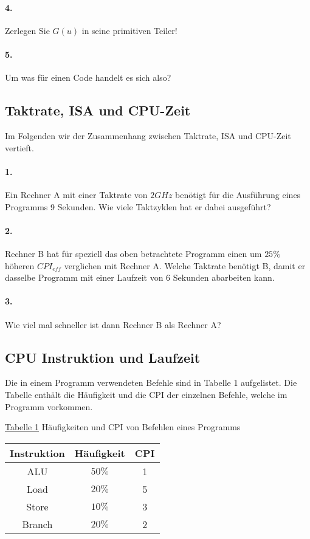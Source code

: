 \documentclass[paper=a4, fontsize=11pt]{scrartcl}
\numberwithin{equation}{section}
\numberwithin{figure}{section}
\numberwithin{table}{section}
\begin{document}
\paragraph{4.}
Zerlegen Sie $G(u)$ in seine primitiven Teiler!

\paragraph{5.}
Um was für einen Code handelt es sich also?

\subsection{Taktrate, ISA und CPU-Zeit}
Im Folgenden wir der Zusammenhang zwischen Taktrate, ISA und CPU-Zeit vertieft.

\paragraph{1.}
Ein Rechner A mit einer Taktrate von $2GHz$ benötigt für die Ausführung eines Programms 9 Sekunden. Wie viele Taktzyklen hat er dabei ausgeführt?

\paragraph{2.}
Rechner B hat für speziell das oben betrachtete Programm einen um $25 \%$ höheren $CPI_{eff}$ verglichen mit Rechner A. Welche Taktrate benötigt B, damit er dasselbe Programm mit einer Laufzeit von 6 Sekunden abarbeiten kann.

\paragraph{3.}
Wie viel mal schneller ist dann Rechner B als Rechner A?

\subsection{CPU Instruktion und Laufzeit}
Die in einem Programm verwendeten Befehle sind in Tabelle 1 aufgelistet. Die Tabelle enthält die Häufigkeit und die CPI der einzelnen Befehle, welche im Programm vorkommen.

\underline{Tabelle 1}
Häufigkeiten und CPI von Befehlen eines Programms
\begin{tabular}{c|c|c}
Instruktion & Häufigkeit & CPI \\
\hline
ALU & $50 \%$ & 1 \\
\hline
Load & $20 \%$ & 5 \\
\hline
Store & $10 \%$ & 3 \\
\hline
Branch & $20 \%$ & 2 \\
\end{tabular}
\end{document}
